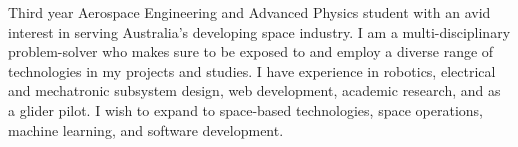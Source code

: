 

\begin{cvparagraph}

Third year Aerospace Engineering and Advanced Physics student with an avid interest in serving Australia's developing space industry. I am a multi-disciplinary problem-solver who makes sure to be exposed to and employ a diverse range of technologies in my projects and studies. I have experience in robotics, electrical and mechatronic subsystem design, web development, academic research, and as a glider pilot. I wish to expand to space-based technologies, space operations, machine learning, and software development.

\end{cvparagraph}
